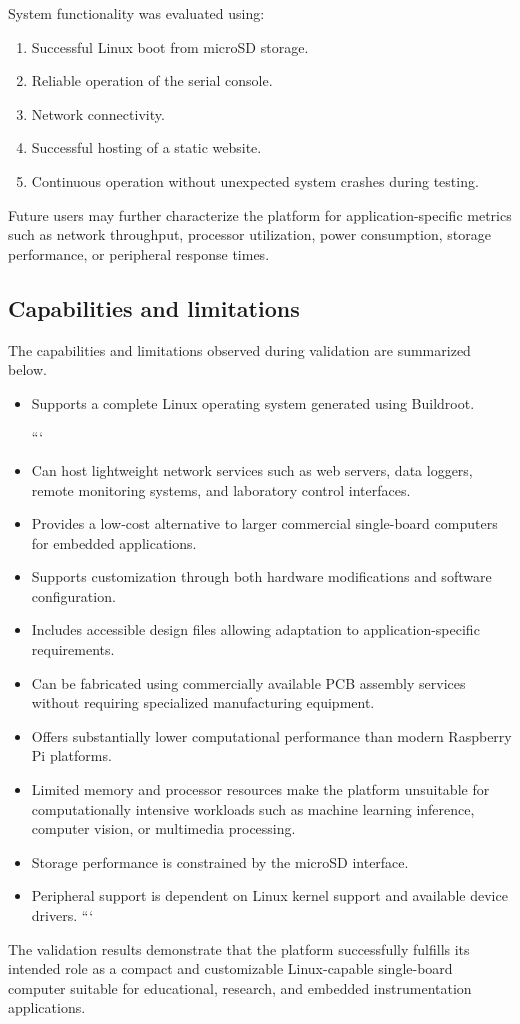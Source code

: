 System functionality was evaluated using:

\begin{enumerate}
\item Successful Linux boot from microSD storage.
\item Reliable operation of the serial console.
\item Network connectivity.
\item Successful hosting of a static website.
\item Continuous operation without unexpected system crashes during testing.
\end{enumerate}

Future users may further characterize the platform for application-specific 
metrics such as network throughput, processor utilization, power consumption, 
storage performance, or peripheral response times.

\subsection{Capabilities and limitations}

The capabilities and limitations observed during validation are summarized below.

\begin{itemize}
\item Supports a complete Linux operating system generated using Buildroot.

```
\item Can host lightweight network services such as web servers, data loggers, 
remote monitoring systems, and laboratory control interfaces.

\item Provides a low-cost alternative to larger commercial single-board computers 
for embedded applications.

\item Supports customization through both hardware modifications and software 
configuration.

\item Includes accessible design files allowing adaptation to application-specific 
requirements.

\item Can be fabricated using commercially available PCB assembly services without 
requiring specialized manufacturing equipment.

\item Offers substantially lower computational performance than modern Raspberry 
Pi platforms.

\item Limited memory and processor resources make the platform unsuitable for 
computationally intensive workloads such as machine learning inference, 
computer vision, or multimedia processing.

\item Storage performance is constrained by the microSD interface.

\item Peripheral support is dependent on Linux kernel support and available 
device drivers.
```

\end{itemize}

The validation results demonstrate that the platform successfully fulfills its 
intended role as a compact and customizable Linux-capable single-board computer 
suitable for educational, research, and embedded instrumentation applications.
